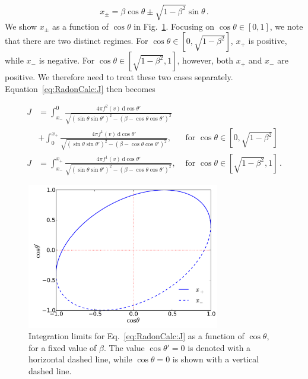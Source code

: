 \begin{equation}
x_{\pm} = \beta\cos\theta \pm \sqrt{1-\beta^2}\sin\theta\,.
\end{equation}
We show $x_{\pm}$ as a function of $\cos\theta$ in Fig.~\ref{fig:RadonCalc:IntegLimits}. Focusing on $\cos\theta \in [0,1]$, we note that there are two distinct regimes. For $\cos\theta \in [0, \sqrt{1-\beta^2}]$, $x_+$ is positive, while $x_-$ is negative. For $\cos\theta \in [\sqrt{1-\beta^2},1]$, however, both $x_+$ and $x_-$ are positive. We therefore need to treat these two cases separately. Equation~\ref{eq:RadonCalc:J} then becomes

\begin{align}
J &= \int_{x_-}^{0} \frac{4\pi f^2(v) \, \mathrm{d}\cos\theta'}{\sqrt{\left(\sin\theta\sin\theta'\right)^2 - \left(\beta - \cos\theta\cos\theta'\right)^2}}  \\
& +\int_{0}^{x_+} \frac{4\pi f^1(v) \, \mathrm{d}\cos\theta'}{\sqrt{\left(\sin\theta\sin\theta'\right)^2 - \left(\beta - \cos\theta\cos\theta'\right)^2}}, & \textrm{ for } \cos\theta \in [0,\sqrt{1-\beta^2}] \nonumber\\
J &= \int_{x_-}^{x_+} \frac{4\pi f^1(v) \, \mathrm{d}\cos\theta'}{\sqrt{\left(\sin\theta\sin\theta'\right)^2 - \left(\beta - \cos\theta\cos\theta'\right)^2}}, & \textrm{ for } \cos\theta \in [\sqrt{1-\beta^2},1]\,.
\end{align}

\begin{figure}[tbh!]
  \centering
  \includegraphics[width=0.75\textwidth]{Directional/Integlimits.pdf}
\caption[Integration limits in the calculation of the Radon transform]{Integration limits for Eq.~\ref{eq:RadonCalc:J} as a function of $\cos\theta$, for a fixed value of $\beta$. The value $\cos\theta' = 0$ is denoted with a horizontal dashed line, while $\cos\theta = 0$ is shown with a vertical dashed line.}
  \label{fig:RadonCalc:IntegLimits}
\end{figure}

